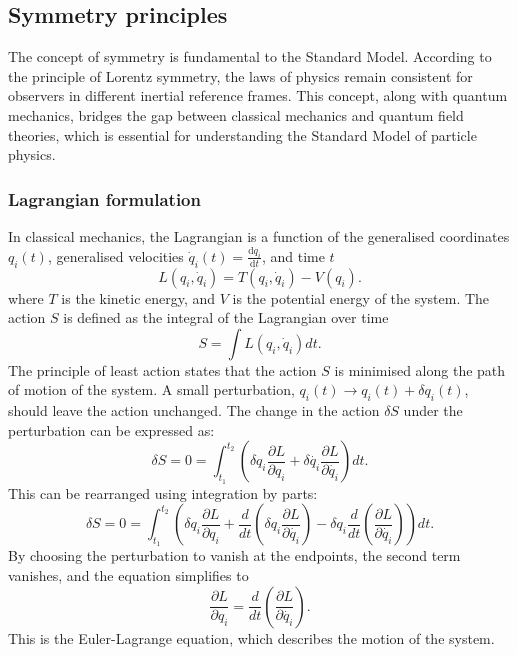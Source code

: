     \subsection{Symmetry principles}
        The concept of symmetry is fundamental to the Standard Model. 
        According to the principle of Lorentz symmetry, the laws of 
        physics remain consistent for observers in different inertial reference 
        frames. This concept, along with quantum mechanics, bridges the gap between 
        classical mechanics and quantum field theories, which is essential for 
        understanding the Standard Model of particle physics.
        \subsubsection{Lagrangian formulation}
            In classical mechanics, the Lagrangian is a function of the
            generalised coordinates $q_i(t)$, generalised velocities $\dot{q}_i(t) = \frac{\text{d}q_i}{\text{d}t}$,
            and time $t$
            \begin{equation}
                L(q_i, \dot{q}_i) = T(q_i, \dot{q}_i) - V(q_i).
            \end{equation}
            where $T$ is the kinetic energy, and $V$ is the potential energy of the system.
            The action $S$ is defined as the integral of the 
            Lagrangian over time
            \begin{equation}
                S = \int L(q_i, \dot{q}_i) dt.
            \end{equation}
            The principle of least action states that the action $S$ is minimised
            along the path of motion of the system.
            A small perturbation, $q_i(t) \rightarrow q_i(t) + \delta q_i(t)$, should leave the action unchanged.
            The change in the action \( \delta S \) under the perturbation can be expressed as:
            \begin{equation}
                \delta S = 0 = \int_{t_1}^{t_2} \left( \delta q_i \frac{\partial L}{\partial q_i} + \delta \dot{q_i} \frac{\partial L}{\partial \dot{q_i}} \right) dt.
            \end{equation}
            This can be rearranged using integration by parts:
            \begin{equation}
                \delta S = 0 = \int_{t_1}^{t_2} \left( \delta q_i \frac{\partial L}{\partial q_i} + \frac{d}{dt} \left( \delta q_i \frac{\partial L}{\partial \dot{q_i}} \right) - \delta q_i \frac{d}{dt} \left( \frac{\partial L}{\partial \dot{q_i}} \right) \right) dt.
            \end{equation}
            By choosing the perturbation to vanish at the endpoints, the second term vanishes, and the equation simplifies to
            \begin{equation}
                \frac{\partial L}{\partial q_i} = \frac{d}{dt} \left( \frac{\partial L}{\partial \dot{q_i}} \right).
            \end{equation}
            This is the Euler-Lagrange equation, which describes the motion of the system.
        

